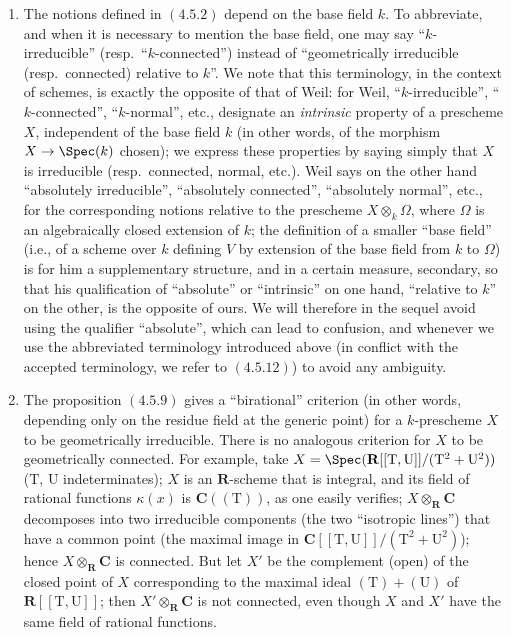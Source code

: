 \begin{remarks}[4.5.12]
\label{IV.4.5.12}
\begin{enumerate}[label=(\roman*)]
  \item The notions defined in $(4.5.2)$ depend on the base field $k$.
To abbreviate, and when it is necessary to mention the base field, one may say ``$k$-irreducible'' (resp.\ ``$k$-connected'') instead of ``geometrically irreducible (resp.\ connected) relative to $k$''.
We note that this terminology, in the context of schemes, is exactly the opposite of that of Weil: for Weil, ``$k$-irreducible'', ``$k$-connected'', ``$k$-normal'', etc., designate an \emph{intrinsic} property of a prescheme $X$, independent of the base field $k$ (in other words, of the morphism $X\to\Spec(k)$ chosen); we express these properties by saying simply that $X$ is irreducible (resp.\ connected, normal, etc.).
Weil says on the other hand ``absolutely irreducible'', ``absolutely connected'', ``absolutely normal'', etc., for the corresponding notions relative to the prescheme $X\otimes_k\Omega$, where $\Omega$ is an algebraically closed extension of $k$; the definition of a smaller ``base field'' (i.e., of a scheme over $k$ defining $V$ by extension of the base field from $k$ to $\Omega$) is for him a supplementary structure, and in a certain measure, secondary, so that his qualification of ``absolute'' or ``intrinsic'' on one hand, ``relative to $k$'' on the other, is the opposite of ours.
We will therefore in the sequel avoid using the qualifier ``absolute'', which can lead to confusion, and whenever we use the abbreviated terminology introduced above (in conflict with the accepted terminology, we refer to $(4.5.12)$) to avoid any ambiguity.
  \item The proposition $(4.5.9)$ gives a ``birational'' criterion (in other words, depending only on the residue field at the generic point) for a $k$-prescheme $X$ to be geometrically irreducible.
There is no analogous criterion for $X$ to be geometrically connected.
For example, take $X=\Spec(\mathbf{R}[[\mathrm{T},\mathrm{U}]]/(\mathrm{T}^2+\mathrm{U}^2))$ ($\mathrm{T}$, $\mathrm{U}$ indeterminates); $X$ is an $\mathbf{R}$-scheme that is integral, and its field of rational functions $\kappa(x)$ is $\mathbf{C}((\mathrm{T}))$, as one easily verifies; $X\otimes_\mathbf{R}\mathbf{C}$ decomposes into two irreducible components (the two ``isotropic lines'') that have a common point (the maximal image in $\mathbf{C}[[\mathrm{T},\mathrm{U}]]/(\mathrm{T}^2+\mathrm{U}^2)$); hence $X\otimes_\mathbf{R}\mathbf{C}$ is connected.
But let $X'$ be the complement (open) of the closed point of $X$ corresponding to the maximal ideal $(\mathrm{T})+(\mathrm{U})$ of $\mathbf{R}[[\mathrm{T},\mathrm{U}]]$; then $X'\otimes_\mathbf{R}\mathbf{C}$ is not connected, even though $X$ and $X'$ have the same field of rational functions.
\end{enumerate}
\end{remarks}

